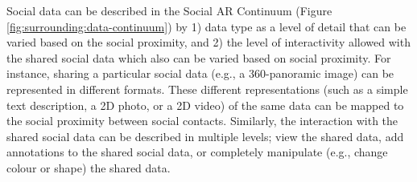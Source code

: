 



Social data can be described in the Social AR Continuum (Figure \ref{fig:surrounding:data-continuum}) by 1) data type as a level of detail that can be varied based on the social proximity, and 2) the level of interactivity allowed with the shared social data which also can be varied based on social proximity. For instance, sharing a particular social data (e.g., a 360-panoramic image) can be represented in different formats. These different representations (such as a simple text description, a 2D photo, or a 2D video) of the same data can be mapped to the social proximity between social contacts. Similarly, the interaction with the shared social data can be described in multiple levels; view the shared data, add annotations to the shared social data, or completely manipulate (e.g., change colour or shape) the shared data. 

